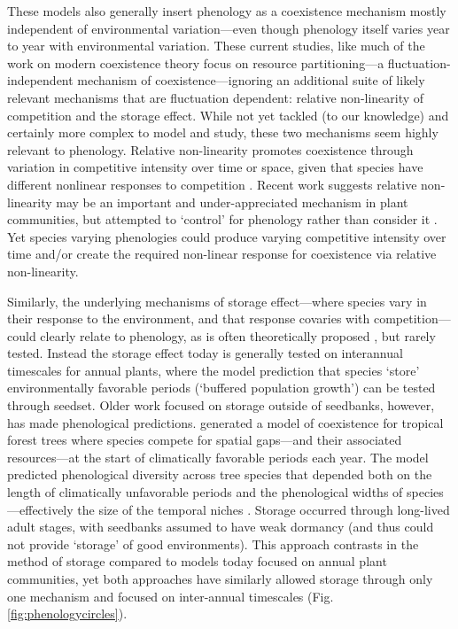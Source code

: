 \documentclass[11pt]{article}
\begin{document}
These models also generally insert phenology as a coexistence mechanism mostly independent of environmental variation---even though phenology itself varies year to year with environmental variation. These current studies, like much of the work on modern coexistence theory focus on resource partitioning---a fluctuation-independent mechanism of coexistence---ignoring an additional suite of likely relevant mechanisms that are fluctuation dependent: relative non-linearity of competition and the storage effect. While not yet tackled (to our knowledge) and certainly more complex to model and study, these two mechanisms seem highly relevant to phenology. Relative non-linearity promotes coexistence through variation in competitive intensity over time or space, given that species have different nonlinear responses to competition \citep{CHESSON:1994vn,Chesson:2000vd}. Recent work suggests relative non-linearity may be an important and under-appreciated mechanism in plant communities, but attempted to `control' for phenology rather than consider it \citep{hallett2019rainfall}. Yet species varying phenologies could produce varying competitive intensity over time and/or create the required non-linear response for coexistence via relative non-linearity. 

Similarly, the underlying mechanisms of storage effect---where species vary in their response to the environment, and that response covaries with competition---could clearly relate to phenology, as is often theoretically proposed \citep{Chesson:1993gi,Chesson:2004eo}, but rarely tested. Instead the storage effect today is generally tested on interannual timescales for annual plants, where the model prediction that species `store' environmentally favorable periods (`buffered population growth') can be tested through seedset. Older work focused on storage outside of seedbanks, however, has made phenological predictions. \citet{Kubo:1996qe} generated a model of coexistence for tropical forest trees where species compete for spatial gaps---and their associated resources---at the start of climatically favorable periods each year. The model predicted phenological diversity across tree species that depended both on the length of climatically unfavorable periods and the phenological widths of species---effectively the size of the temporal niches \citep{Kubo:1996qe}. Storage occurred through long-lived adult stages, with seedbanks assumed to have weak dormancy (and thus could not provide `storage' of good environments). This approach contrasts in the method of storage compared to models today focused on annual plant communities, yet both approaches have similarly allowed storage through only one mechanism and focused on inter-annual timescales (Fig. \ref{fig:phenologycircles}).
\end{document}
